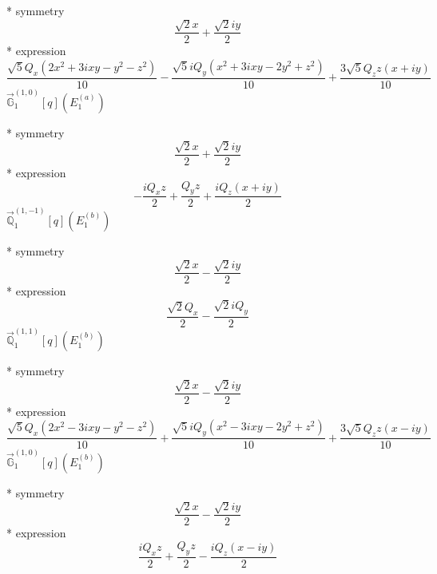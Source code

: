 \documentclass[fleqn,8pt]{jsarticle}
\begin{document}
\noindent\quad ** symmetry
\begin{dmath*}
\frac{\sqrt{2} x}{2} + \frac{\sqrt{2} i y}{2}
\end{dmath*}
\noindent\quad ** expression
\begin{dmath*}
\frac{\sqrt{5} Q_{x} \left(2 x^{2} + 3 i x y - y^{2} - z^{2}\right)}{10} - \frac{\sqrt{5} i Q_{y} \left(x^{2} + 3 i x y - 2 y^{2} + z^{2}\right)}{10} + \frac{3 \sqrt{5} Q_{z} z \left(x + i y\right)}{10}
\end{dmath*}
\noindent\quad $\vec{\mathbb{G}}_{1}^{(1,0)}[q](E_{1}^{(a)})$

\noindent\quad ** symmetry
\begin{dmath*}
\frac{\sqrt{2} x}{2} + \frac{\sqrt{2} i y}{2}
\end{dmath*}
\noindent\quad ** expression
\begin{dmath*}
- \frac{i Q_{x} z}{2} + \frac{Q_{y} z}{2} + \frac{i Q_{z} \left(x + i y\right)}{2}
\end{dmath*}
\noindent\quad $\vec{\mathbb{Q}}_{1}^{(1,-1)}[q](E_{1}^{(b)})$

\noindent\quad ** symmetry
\begin{dmath*}
\frac{\sqrt{2} x}{2} - \frac{\sqrt{2} i y}{2}
\end{dmath*}
\noindent\quad ** expression
\begin{dmath*}
\frac{\sqrt{2} Q_{x}}{2} - \frac{\sqrt{2} i Q_{y}}{2}
\end{dmath*}
\noindent\quad $\vec{\mathbb{Q}}_{1}^{(1,1)}[q](E_{1}^{(b)})$

\noindent\quad ** symmetry
\begin{dmath*}
\frac{\sqrt{2} x}{2} - \frac{\sqrt{2} i y}{2}
\end{dmath*}
\noindent\quad ** expression
\begin{dmath*}
\frac{\sqrt{5} Q_{x} \left(2 x^{2} - 3 i x y - y^{2} - z^{2}\right)}{10} + \frac{\sqrt{5} i Q_{y} \left(x^{2} - 3 i x y - 2 y^{2} + z^{2}\right)}{10} + \frac{3 \sqrt{5} Q_{z} z \left(x - i y\right)}{10}
\end{dmath*}
\noindent\quad $\vec{\mathbb{G}}_{1}^{(1,0)}[q](E_{1}^{(b)})$

\noindent\quad ** symmetry
\begin{dmath*}
\frac{\sqrt{2} x}{2} - \frac{\sqrt{2} i y}{2}
\end{dmath*}
\noindent\quad ** expression
\begin{dmath*}
\frac{i Q_{x} z}{2} + \frac{Q_{y} z}{2} - \frac{i Q_{z} \left(x - i y\right)}{2}
\end{dmath*}
\end{document}
